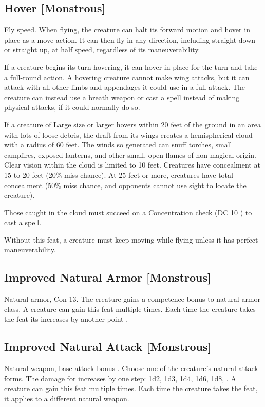 {\subsection{Hover [Monstrous]}
 Fly speed.
 When flying, the creature can halt its forward motion and hover in place as a move action. It can then fly in any direction, including straight down or straight up, at half speed, regardless of its maneuverability.

If a creature begins its turn hovering, it can hover in place for the turn and take a full-round action. A hovering creature cannot make wing attacks, but it can attack with all other limbs and appendages it could use in a full attack. The creature can instead use a breath weapon or cast a spell instead of making physical attacks, if it could normally do so.

If a creature of Large size or larger hovers within 20 feet of the ground in an area with lots of loose debris, the draft from its wings creates a hemispherical cloud with a radius of 60 feet. The winds so generated can snuff torches, small campfires, exposed lanterns, and other small, open flames of non-magical origin. Clear vision within the cloud is limited to 10 feet. Creatures have concealment at 15 to 20 feet (20\% miss chance). At 25 feet or more, creatures have total concealment (50\% miss chance, and opponents cannot use sight to locate the creature).

Those caught in the cloud must succeed on a Concentration check (DC 10 \add {} ) to cast a spell.

 Without this feat, a creature must keep moving while flying unless it has perfect maneuverability.

\subsection{Improved Natural Armor [Monstrous]}
 Natural armor, Con 13.
 The creature gains a  competence bonus to natural armor class.
 A creature can gain this feat multiple times. Each time the creature takes the feat its  increases by another point .

\subsection{Improved Natural Attack [Monstrous]}
 Natural weapon, base attack bonus .
 Choose one of the creature's natural attack forms. The damage for  increases by one step: 1d2, 1d3, 1d4, 1d6, 1d8, .
 A creature can gain this feat multiple times. Each time the creature takes the feat, it applies to a different natural weapon.

}
